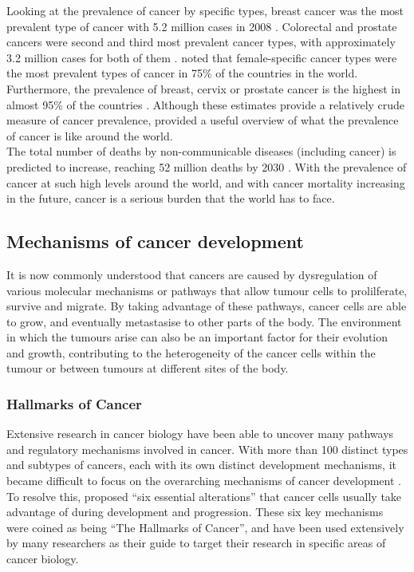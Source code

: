 Looking at the prevalence of cancer by specific types, breast cancer was the most prevalent type of cancer with 5.2 million cases in 2008 \citep{Bray2013}.
Colorectal and prostate cancers were second and third most prevalent cancer types, with approximately 3.2 million cases for  both of them \citep{Bray2013}.
\citet{Bray2013} noted that female-specific cancer types were the most prevalent types of cancer in 75\% of the countries in the world.
Furthermore, the prevalence of breast, cervix or prostate cancer is the highest in almost 95\% of the countries \citep{Bray2013}.
Although these estimates provide a relatively crude measure of cancer prevalence, \citet{Bray2013} provided a useful overview of what the prevalence of cancer is like around the world.\\

\noindent
The total number of deaths by non-communicable diseases (including cancer) is predicted to increase, reaching 52 million deaths by 2030 \citep{WHO2014}.
With the prevalence of cancer at such high levels around the world, and with cancer mortality increasing in the future, cancer is a serious burden that the world has to face.

\subsection{Mechanisms of cancer development}
\label{sub:mechanisms_of_cancer_development}

It is now commonly understood that cancers are caused by dysregulation of various molecular mechanisms or pathways that allow tumour cells to prolilferate, survive and migrate.
By taking advantage of these pathways, cancer cells are able to grow, and eventually metastasise to other parts of the body.
The environment in which the tumours arise can also be an important factor for their evolution and growth, contributing to the heterogeneity of the cancer cells within the tumour or between tumours at different sites of the body.

\subsubsection{Hallmarks of Cancer}
\label{subsubsec:cancerhallmarks}

Extensive research in cancer biology have been able to uncover many pathways and regulatory mechanisms involved in cancer.
With more than 100 distinct types and subtypes of cancers, each with its own distinct development mechanisms, it became difficult to focus on the overarching mechanisms of cancer development \citep{Hanahan2000}.
To resolve this, \citet{Hanahan2000} proposed ``six essential alterations'' that cancer cells usually take advantage of during development and progression.
These six key mechanisms were coined as being ``The Hallmarks of Cancer'', and have been used extensively by many researchers as their guide to target their research in specific areas of cancer biology.


